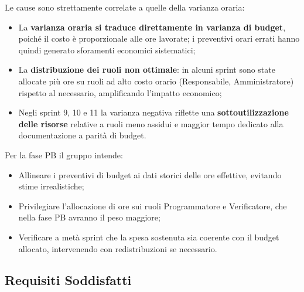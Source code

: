 \documentclass[a4paper,11pt,oneside]{scrartcl}
\begin{document}
Le cause sono strettamente correlate a quelle della varianza oraria:
\begin{itemize}
    \item La \textbf{varianza oraria si traduce direttamente in varianza di budget}, poiché il costo è proporzionale alle ore lavorate; i preventivi orari errati hanno quindi generato sforamenti economici sistematici;
    \item La \textbf{distribuzione dei ruoli non ottimale}: in alcuni sprint sono state allocate più ore su ruoli ad alto costo orario (Responsabile, Amministratore) rispetto al necessario, amplificando l'impatto economico;
    \item Negli sprint 9, 10 e 11 la varianza negativa riflette una \textbf{sottoutilizzazione delle risorse} relative a ruoli meno assidui e maggior tempo dedicato alla documentazione a parità di budget.
\end{itemize}

Per la fase PB il gruppo intende:
\begin{itemize}
    \item Allineare i preventivi di budget ai dati storici delle ore effettive, evitando stime irrealistiche;
    \item Privilegiare l'allocazione di ore sui ruoli Programmatore e Verificatore, che nella fase PB avranno il peso maggiore;
    \item Verificare a metà sprint che la spesa sostenuta sia coerente con il budget allocato, intervenendo con redistribuzioni se necessario.
\end{itemize}

\subsection{Requisiti Soddisfatti}
\end{document}

